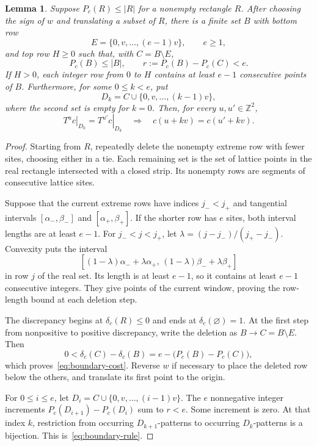 \documentclass[11pt,a4paper,reqno]{amsart}
\newtheorem{lemma}[theorem]{Lemma}
\theoremstyle{remark}
\newcommand{\Z}{\mathbb Z}
\newcommand{\restr}[2]{\left.#1\right|_{#2}}
\numberwithin{equation}{section}
\begin{document}
\begin{lemma}\label{lem:boundary-window}
Suppose $P_c(R)\le|R|$ for a nonempty rectangle $R$. After choosing the sign of $w$ and translating a subset of $R$, there is a finite set $B$ with bottom row
\[
 E=\{0,v,\ldots,(e-1)v\},\qquad e\ge1,
\]
and top row $H\ge0$ such that, with $C=B\setminus E$,
\begin{equation}\label{eq:boundary-cost}
 P_c(B)\le|B|,\qquad r:=P_c(B)-P_c(C)<e.
\end{equation}
If $H>0$, each integer row from $0$ to $H$ contains at least $e-1$ consecutive points of $B$. Furthermore, for some $0\le k<e$, put
\begin{equation}\label{eq:boundary-rule-domain}
 D_k=C\cup\{0,v,\ldots,(k-1)v\},
\end{equation}
where the second set is empty for $k=0$. Then, for every $u,u'\in\Z^2$,
\begin{equation}\label{eq:boundary-rule}
 \restr{T^u c}{D_k}=\restr{T^{u'}c}{D_k}
 \quad\Longrightarrow\quad c(u+kv)=c(u'+kv).
\end{equation}
\end{lemma}
\begin{proof}
Starting from $R$, repeatedly delete the nonempty extreme row with fewer sites, choosing either in a tie. Each remaining set is the set of lattice points in the real rectangle intersected with a closed strip. Its nonempty rows are segments of consecutive lattice sites.

Suppose that the current extreme rows have indices $j_-<j_+$ and tangential intervals $[\alpha_-,\beta_-]$ and $[\alpha_+,\beta_+]$. If the shorter row has $e$ sites, both interval lengths are at least $e-1$. For $j_-<j<j_+$, let $\lambda=(j-j_-)/(j_+-j_-)$. Convexity puts the interval
\[
 [(1-\lambda)\alpha_-+\lambda\alpha_+,\,
   (1-\lambda)\beta_-+\lambda\beta_+]
\]
in row $j$ of the real set. Its length is at least $e-1$, so it contains at least $e-1$ consecutive integers. They give points of the current window, proving the row-length bound at each deletion step.

The discrepancy begins at $\delta_c(R)\le0$ and ends at $\delta_c(\varnothing)=1$. At the first step from nonpositive to positive discrepancy, write the deletion as $B\to C=B\setminus E$. Then
\[
 0<\delta_c(C)-\delta_c(B)
 =e-\bigl(P_c(B)-P_c(C)\bigr),
\]
which proves~\eqref{eq:boundary-cost}. Reverse $w$ if necessary to place the deleted row below the others, and translate its first point to the origin.

For $0\le i\le e$, let $D_i=C\cup\{0,v,\ldots,(i-1)v\}$. The $e$ nonnegative integer increments $P_c(D_{i+1})-P_c(D_i)$ sum to $r<e$. Some increment is zero. At that index $k$, restriction from occurring $D_{k+1}$-patterns to occurring $D_k$-patterns is a bijection. This is~\eqref{eq:boundary-rule}.
\end{proof}
\end{document}
